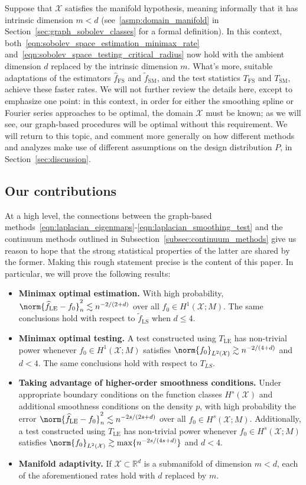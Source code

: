 \documentclass{article}
\newcommand{\Reals}{\mathbb{R}}
\newcommand{\1}{\mathbf{1}}
\newcommand{\Rd}{\Reals^d}
\newcommand{\Xset}{\mathcal{X}}
\newcommand{\Leb}{L}
\newcommand{\mc}[1]{\mathcal{#1}}
\newcommand{\wt}[1]{\widetilde{#1}}
\newcommand{\wh}[1]{\widehat{#1}}
\newcommand{\LE}{\mathrm{LE}}
\newcommand{\LS}{\mathrm{LS}}
\newcommand{\SM}{\mathrm{SM}}
\newcommand{\OS}{\mathrm{FS}}
\theoremstyle{alden}
\theoremstyle{aldenthm}
\theoremstyle{definition}
\theoremstyle{remark}
\begin{document}
Suppose that $\Xset$ satisfies the manifold hypothesis, meaning informally that it has intrinsic dimension $m < d$ (see~\ref{asmp:domain_manifold} in Section~\ref{sec:graph_sobolev_classes} for a formal definition). In this context, both~\eqref{eqn:sobolev_space_estimation_minimax_rate} and~\eqref{eqn:sobolev_space_testing_critical_radius} now hold with the ambient dimension $d$ replaced by the intrinsic dimension $m$. What's more, suitable adaptations of the estimators $\wh{f}_{\OS}$ and $\wt{f}_{\SM}$, and the test statistics $T_{\OS}$ and $T_{\SM}$, achieve these faster rates. We will not further review the details here, except to emphasize one point: in this context, in order for either the smoothing spline or Fourier series approaches to be optimal, the domain $\Xset$ must be known; as we will see, our graph-based procedures will be optimal without this requirement. We will return to this topic, and comment more generally on how different methods and analyzes make use of different assumptions on the design distribution $P$, in Section~\ref{sec:discussion}.

\subsection{Our contributions}
\label{subsec:our_contributions}

At a high level, the connections between the graph-based methods~\eqref{eqn:laplacian_eigenmaps}-\eqref{eqn:laplacian_smoothing_test} and the continuum methods outlined in Subsection~\ref{subsec:continuum_methods} give us reason to hope that the strong statistical properties of the latter are shared by the former. Making this rough statement precise is the content of this paper. In particular, we will prove the following results:

\begin{itemize}
	\item \textbf{Minimax optimal estimation.}
	With high probability, $\norm{\wh{f}_{\LE} - f_0}_{n}^2 \lesssim n^{-2/(2 + d)}$ over all $f_0 \in H^1(\Xset;M)$. The same conclusions hold with respect to $\wt{f}_{\LS}$ when $d \leq 4$. 
	\item \textbf{Minimax optimal testing.}
	A test constructed using $T_{\LE}$ has non-trivial power whenever $f_0 \in H^1(\Xset;M)$ satisfies $\norm{f_0}_{\Leb^2(\Xset)} \gtrsim n^{-2/(4 + d)}$ and $d < 4$. The same conclusions hold with respect to $T_{LS}$.
	\item \textbf{Taking advantage of higher-order smoothness conditions.} Under appropriate boundary conditions on the function classes $H^s(\Xset)$ and additional smoothness conditions on the density $p$, with high probability the error $\norm{\wh{f}_{\LE} - f_0}_{n}^2 \lesssim n^{-2s/(2s + d)}$ over all $f_0 \in H^s(\Xset;M)$. Additionally, a test constructed using $T_{\LE}$ has non-trivial power whenever $f_0 \in H^s(\Xset;M)$ satisfies $\norm{f_0}_{\Leb^2(\Xset)} \gtrsim \max\{n^{-2s/(4s + d)}\}$ and $d < 4$.
	\item \textbf{Manifold adaptivity.}
	If $\mc{X} \subset \Rd$ is a submanifold of dimension $m < d$, each of the aforementioned rates hold with $d$ replaced by $m$.
\end{itemize}
\end{document}
